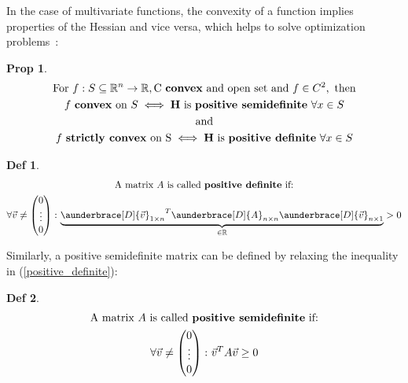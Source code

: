 \documentclass[../convex_optimization.tex]{subfiles}
\theoremstyle{definition} \newtheorem{defi}{Def}
\theoremstyle{definition} \newtheorem{prop}{Prop}
\begin{document}
In the case of multivariate functions, the convexity of a function
implies properties of the Hessian and vice versa, which
helps to solve optimization problems~\cite{bordeaux}:
\begin{prop}
\begin{gather}
    \text{For } f: S \subseteq \mathbb R^n \to \mathbb R,
    \text{C \textbf{convex} and open set and } f \in C^2,
    \text{ then}\nonumber\\
    f \text{ \textbf{convex} on }S \iff
    \mathbf H \text{ is \textbf{positive semidefinite} } \forall x \in S\label{hessian_convex}\\
    \text{and}\nonumber\\
    f \text{ \textbf{strictly convex} on S} \iff
    \mathbf H \text{ is \textbf{positive definite} } \forall x \in S
\end{gather}
\end{prop}
\begin{defi}
\begin{gather}
    \text{A matrix $A$ is called \textbf{positive definite} if:}
    \nonumber\\
    \forall \vec{v} \neq 
    \begin{pmatrix} 0 \\ \vdots \\ 0
    \end{pmatrix}\colon
    \rlap{\ensuremath{\underbrace{\phantom{
                    {\aunderbrace[D]{\vec{v}}_{1\times n}}^T
                    \aunderbrace[D]{A}_{n\times n}
                    \aunderbrace[D]{\vec{v}}_{n\times 1}
    }}_{\in \mathbb R}}}
    {\aunderbrace[D]{\vec{v}}_{1\times n}}^T
    \aunderbrace[D]{A}_{n\times n}
    \aunderbrace[D]{\vec{v}}_{n\times 1}
    > 0
    \label{positive_definite}
\end{gather}
\end{defi}
Similarly, a positive semidefinite matrix can be defined by relaxing the inequality in (\ref{positive_definite}):
\begin{defi}
\begin{gather}
    \text{A matrix $A$ is called \textbf{positive semidefinite} if:}
    \nonumber\\
    \forall \vec{v} \neq 
    \begin{pmatrix} 0 \\ \vdots \\ 0
    \end{pmatrix}\colon
    \vec{v}^T\space A\space \vec{v} \geq 0
\end{gather}
\end{defi}
\end{document}
